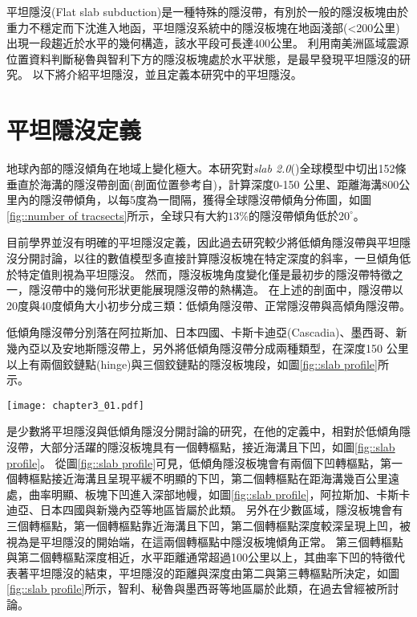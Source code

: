 平坦隱沒(Flat slab subduction)是一種特殊的隱沒帶，有別於一般的隱沒板塊由於重力不穩定而下沈進入地函，平坦隱沒系統中的隱沒板塊在地函淺部(<200公里)出現一段趨近於水平的幾何構造，該水平段可長達400公里。
\citealp{barazangi1976}利用南美洲區域震源位置資料判斷秘魯與智利下方的隱沒板塊處於水平狀態，是最早發現平坦隱沒的研究。
以下將介紹平坦隱沒，並且定義本研究中的平坦隱沒。

\section{平坦隱沒定義}\label{平坦隱沒定義}

地球內部的隱沒傾角在地域上變化極大。本研究對\textsl{slab 2.0}(\citealp{hayes2018slab2})全球模型中切出152條垂直於海溝的隱沒帶剖面(剖面位置參考自\citealp{Hu2020})，計算深度0-150 公里、距離海溝800公里內的隱沒帶傾角，以每5度為一間隔，獲得全球隱沒帶傾角分佈圖，如圖\ref{fig::number of tracsects}所示，全球只有大約$13\%$的隱沒帶傾角低於$20^\circ$。

目前學界並沒有明確的平坦隱沒定義，因此過去研究較少將低傾角隱沒帶與平坦隱沒分開討論，以往的數值模型多直接計算隱沒板塊在特定深度的斜率，一旦傾角低於特定值則視為平坦隱沒。
然而，隱沒板塊角度變化僅是最初步的隱沒帶特徵之一，隱沒帶中的幾何形狀更能展現隱沒帶的熱構造。
在上述的剖面中，隱沒帶以20度與40度傾角大小初步分成三類：低傾角隱沒帶、正常隱沒帶與高傾角隱沒帶。

低傾角隱沒帶分別落在阿拉斯加、日本四國、卡斯卡迪亞(Cascadia)、墨西哥、新幾內亞以及安地斯隱沒帶上，\citealp{schellart2020control}另外將低傾角隱沒帶分成兩種類型，在深度150 公里以上有兩個鉸鏈點(hinge)與三個鉸鏈點的隱沒板塊段，如圖\ref{fig::slab profile}所示。

\begin{figure*}[ht!]
    \centering
    \texttt{[image: chapter3\_01.pdf]}
    \caption[全球$152$條隱沒帶剖面傾角長條分布圖]{全球$152$條隱沒帶剖面傾角長條分布圖，其中綠底為隱沒剖面傾角低於$20^\circ$的剖面個數，佔整體$13\%$;粉紅底為剖面傾角介於$20^\circ-39^\circ$之間的剖面個數，佔整體$73\%$，粉藍底則為剖面傾角高於$40^\circ$的剖面個數，佔總體$14\%$。}
    \label{fig::number of tracsects}
\end{figure*}

\citealp{schellart2020control}是少數將平坦隱沒與低傾角隱沒分開討論的研究，在他的定義中，相對於低傾角隱沒帶，大部分活躍的隱沒板塊具有一個轉樞點，接近海溝且下凹，如圖\ref{fig::slab profile}。
從圖\ref{fig::slab profile}可見，低傾角隱沒板塊會有兩個下凹轉樞點，第一個轉樞點接近海溝且呈現平緩不明顯的下凹，第二個轉樞點在距海溝幾百公里遠處，曲率明顯、板塊下凹進入深部地幔，如圖\ref{fig::slab profile}，阿拉斯加、卡斯卡迪亞、日本四國與新幾內亞等地區皆屬於此類。
另外在少數區域，隱沒板塊會有三個轉樞點，第一個轉樞點靠近海溝且下凹，第二個轉樞點深度較深呈現上凹，被視為是平坦隱沒的開始端，在這兩個轉樞點中隱沒板塊傾角正常。
第三個轉樞點與第二個轉樞點深度相近，水平距離通常超過100公里以上，其曲率下凹的特徵代表著平坦隱沒的結束，平坦隱沒的距離與深度由第二與第三轉樞點所決定，如圖\ref{fig::slab profile}所示，智利、秘魯與墨西哥等地區屬於此類，在過去曾經被\citealp{Manea2017}所討論。


